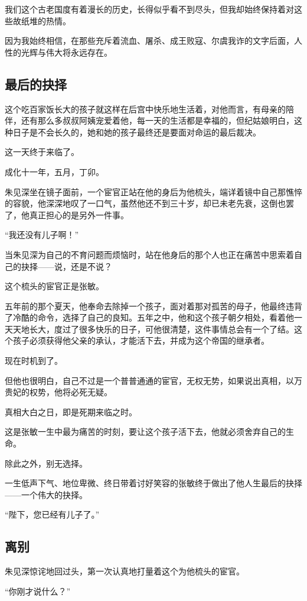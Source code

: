 \begin{multicols}{\theparacolNo}
我们这个古老国度有着漫长的历史，长得似乎看不到尽头，但我却始终保持着对这些故纸堆的热情。

因为我始终相信，在那些充斥着流血、屠杀、成王败寇、尔虞我诈的文字后面，人性的光辉与伟大将永远存在。

\subsection{最后的抉择}
这个吃百家饭长大的孩子就这样在后宫中快乐地生活着，对他而言，有母亲的陪伴，还有那么多叔叔阿姨宠爱着他，每一天的生活都是幸福的，但纪姑娘明白，这种日子是不会长久的，她和她的孩子最终还是要面对命运的最后裁决。

这一天终于来临了。

成化十一年，五月，丁卯。

朱见深坐在镜子面前，一个宦官正站在他的身后为他梳头，端详着镜中自己那憔悴的容貌，他深深地叹了一口气，虽然他还不到三十岁，却已未老先衰，这倒也罢了，他真正担心的是另外一件事。

“我还没有儿子啊！”

当朱见深为自己的不育问题而烦恼时，站在他身后的那个人也正在痛苦中思索着自己的抉择——说，还是不说？

这个梳头的宦官正是张敏。

五年前的那个夏天，他奉命去除掉一个孩子，面对着那对孤苦的母子，他最终违背了冷酷的命令，选择了自己的良知。五年之中，他和这个孩子朝夕相处，看着他一天天地长大，度过了很多快乐的日子，可他很清楚，这件事情总会有一个了结。这个孩子必须获得他父亲的承认，才能活下去，并成为这个帝国的继承者。

现在时机到了。

但他也很明白，自己不过是一个普普通通的宦官，无权无势，如果说出真相，以万贵妃的权势，他将必死无疑。

真相大白之日，即是死期来临之时。

这是张敏一生中最为痛苦的时刻，要让这个孩子活下去，他就必须舍弃自己的生命。

除此之外，别无选择。

一生低声下气、地位卑微、终日带着讨好笑容的张敏终于做出了他人生最后的抉择——一个伟大的抉择。

“陛下，您已经有儿子了。”

\subsection{离别}
朱见深惊诧地回过头，第一次认真地打量着这个为他梳头的宦官。

“你刚才说什么？”


\end{multicols}
